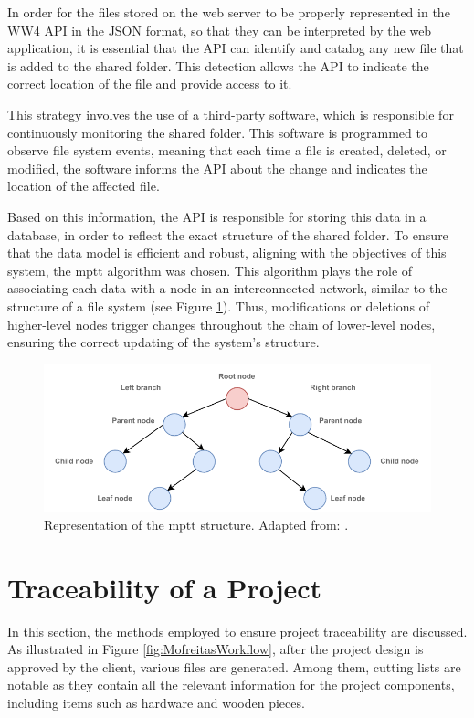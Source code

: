 In order for the files stored on the web server to be properly represented in the WW4 API in the JSON format, so that they can be interpreted by the web application, it is essential that the API can identify and catalog any new file that is added to the shared folder. This detection allows the API to indicate the correct location of the file and provide access to it.

This strategy involves the use of a third-party software, which is responsible for continuously monitoring the shared folder. This software is programmed to observe file system events, meaning that each time a file is created, deleted, or modified, the software informs the API about the change and indicates the location of the affected file.

Based on this information, the API is responsible for storing this data in a database, in order to reflect the exact structure of the shared folder. To ensure that the data model is efficient and robust, aligning with the objectives of this system, the \acrfull{mptt} algorithm was chosen. This algorithm plays the role of associating each data with a node in an interconnected network, similar to the structure of a file system (see Figure \ref{fig:syncFilesMPTT}). Thus, modifications or deletions of higher-level nodes trigger changes throughout the chain of lower-level nodes, ensuring the correct updating of the system's structure.

\begin{figure}[!ht]
    \centering
    \includegraphics[width=.65\linewidth]{images/Development/chap3/MPTT.pdf}
    \caption{Representation of the \acrfull{mptt} structure. Adapted from: \cite{srihithnavigating}.}
    \label{fig:syncFilesMPTT}
\end{figure}



\section{Traceability of a Project}\label{section:ProjectTraceability}

In this section, the methods employed to ensure project traceability are discussed. As illustrated in Figure \ref{fig:MofreitasWorkflow}, after the project design is approved by the client, various files are generated. Among them, cutting lists are notable as they contain all the relevant information for the project components, including items such as hardware and wooden pieces.

